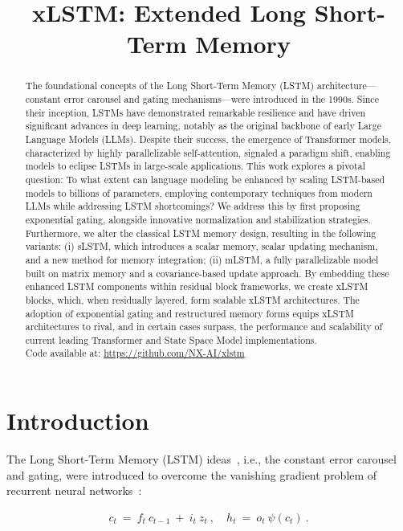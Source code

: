 \title{xLSTM: Extended Long Short-Term Memory}

\begin{abstract}
The foundational concepts of the Long Short-Term Memory (LSTM) architecture—constant error carousel and gating mechanisms—were introduced in the 1990s. Since their inception, LSTMs have demonstrated remarkable resilience and have driven significant advances in deep learning, notably as the original backbone of early Large Language Models (LLMs). Despite their success, the emergence of Transformer models, characterized by highly parallelizable self-attention, signaled a paradigm shift, enabling models to eclipse LSTMs in large-scale applications. This work explores a pivotal question: To what extent can language modeling be enhanced by scaling LSTM-based models to billions of parameters, employing contemporary techniques from modern LLMs while addressing LSTM shortcomings? We address this by first proposing exponential gating, alongside innovative normalization and stabilization strategies. Furthermore, we alter the classical LSTM memory design, resulting in the following variants: (i) sLSTM, which introduces a scalar memory, scalar updating mechanism, and a new method for memory integration; (ii) mLSTM, a fully parallelizable model built on matrix memory and a covariance-based update approach. By embedding these enhanced LSTM components within residual block frameworks, we create xLSTM blocks, which, when residually layered, form scalable xLSTM architectures. The adoption of exponential gating and restructured memory forms equips xLSTM architectures to rival, and in certain cases surpass, the performance and scalability of current leading Transformer and State Space Model implementations.\\
Code available at: \url{https://github.com/NX-AI/xlstm}
\end{abstract}

\section{Introduction}
\label{sec:intro}

The Long Short-Term Memory (LSTM) ideas~\citep{Hochreiter:91,Hochreiter:97nips,Hochreiter:97}, i.e., the constant error carousel and gating, were introduced to overcome the vanishing gradient problem of recurrent neural networks~\citep{Hochreiter:91,Hochreiter:00book}:

\begin{align}
\label{eq:lstm_idea}
  c_t \ = \ f_t \ c_{t-1} \ + \ 
          i_t \  z_t \ , \quad  
          h_t \ = \ o_t \ \psi({c_t}) \ . 
\end{align}

